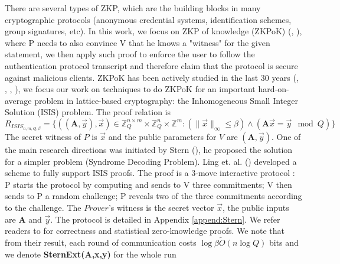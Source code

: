 There are several types of ZKP, which are the building blocks in many
cryptographic protocols (anonymous credential systems, identification schemes,
group signatures, etc). In this work, we focus on ZKP of knowledge (ZKPoK)
(\cite{bellare1992defining}, \cite{goldwasser1989knowledge}), where P needs to
also convince V that he knows a "witness" for the given statement, we then apply
such proof to enforce the user to follow the authentication protocol transcript
and therefore claim that the protocol is secure against malicious clients.
ZKPoK has been actively studied in the last 30 years (\cite{feige1988zero},
\cite{rackoff1991non}, \cite{micciancio2003statistical},
\cite{ling2013improved}), we focus our work on techniques to do ZKPoK for an
important hard-on-average problem in lattice-based cryptography: the
Inhomogeneous Small Integer Solution (ISIS) problem. The proof relation is
\[ R_{ISIS_{n,m,Q,\beta}} = \{ ((\mathbf{A},\vec{y}),\vec{x}) \in
  \mathbb{Z}_Q^{n\times m} \times \mathbb{Z}_Q^n \times \mathbb{Z}^m:
  (\|\vec{x}\|_\infty \leq \beta) \land (\mathbf{A}\vec{x} = \vec{y} \mod Q) \}
\]
The secret witness of \(P\) is \(\vec{x}\) and the public parameters for \(V\)
are \((\mathbf{A},\vec{y})\).  One of the main research directions was initiated
by Stern (\cite{stern1993new}), he proposed the solution for a simpler problem
(Syndrome Decoding Problem).  Ling et. al. (\cite{ling2013improved}) developed a
scheme to fully support ISIS proofs. The proof is a 3-move interactive protocol
: P starts the protocol by computing and sends to V three commitments; V then
sends to P a random challenge; P reveals two of the three commitments according
to the challenge. The $Prover$'s witness is the secret vector $\vec{x}$, the
public inputs are $\mathbf{A}$ and $\vec{y}$. The protocol is detailed in
Appendix \ref{append:Stern}. We refer readers to \cite{ling2013improved} for
correctness and statistical zero-knowledge proofs. We note that from their
result, each round of communication costs $\log\beta\tilde{O}(n \log Q)$ bits
and we denote \textbf{SternExt(A,x,y)} for the whole run



